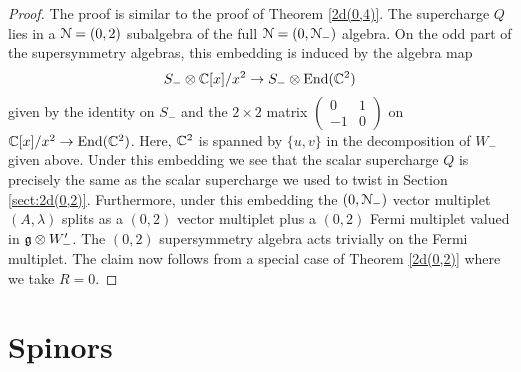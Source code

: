\documentclass[10pt, oneside]{article}
\begin{document}
\begin{proof}
The proof is similar to the proof of Theorem \ref{2d(0,4)}.
The supercharge $Q$ lies in a $\mathcal N = (0,2)$ subalgebra of the full $\mathcal N = (0,\mathcal N_-)$ algebra.
On the odd part of the supersymmetry algebras, this embedding is induced by the algebra map
\[
S_- \otimes \mathbb C[x] / x^2 \to S_- \otimes {\rm End}(\mathbb C^2)
\]
given by the identity on $S_-$ and the $2 \times 2$ matrix $\begin{pmatrix} 0 &1 \\ -1 & 0 \end{pmatrix}$ on $\mathbb C[x]/x^2 \to {\rm End}(\mathbb C^2)$. 
Here, $\mathbb C^2$ is spanned by $\{u,v\}$ in the decomposition of $W_-$ given above.
Under this embedding we see that the scalar supercharge $Q$ is precisely the same as the scalar supercharge we used to twist in Section \ref{sect:2d(0,2)}. 
Furthermore, under this embedding the $(0,\mathcal N_-)$ vector multiplet $(A, \lambda)$ splits as a $(0,2)$ vector multiplet plus a $(0,2)$ Fermi multiplet valued in $\mathfrak g \otimes W_-'$. 
The $(0,2)$ supersymmetry algebra acts trivially on the Fermi multiplet. 
The claim now follows from a special case of Theorem \ref{2d(0,2)} where we take $R = 0$. 
%
\end{proof}

\appendix

\section{Spinors}
\label{sect:spinors}
\end{document}
